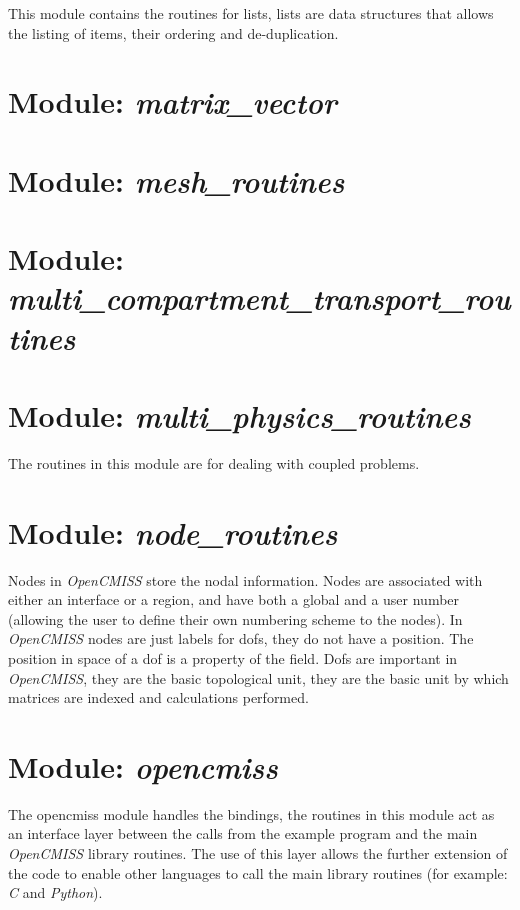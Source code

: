 This module contains the routines for lists, lists are data structures that 
allows the listing of items, their ordering and de-duplication.


\section{Module: \emph{matrix\_vector}}
\label{sec:matrixvector}


\section{Module: \emph{mesh\_routines}}
\label{sec:meshroutines}


\section{Module: \\ \emph{multi\_compartment\_transport\_routines}}
\label{sec:multicompartmenttransportroutines}


\section{Module: \emph{multi\_physics\_routines}}
\label{sec:multiphysicsroutines}

The routines in this module are for dealing with coupled problems.


\section{Module: \emph{node\_routines}}
\label{sec:noderoutines}

Nodes in \emph{OpenCMISS} store the nodal information. Nodes are 
associated with either an interface or a region, and have both a global 
and a user number (allowing the user to define their own numbering scheme 
to the nodes). In \emph{OpenCMISS} nodes are just labels for dofs, they 
do not have a position. The position in space of a dof is a property of 
the field. Dofs are important in \emph{OpenCMISS}, they are the basic topological 
unit, they are the basic unit by which matrices are indexed and 
calculations performed.


\section{Module: \emph{opencmiss}}
\label{sec:opencmiss}

The opencmiss module handles the bindings, the routines in this module act as 
an interface layer between the calls from the example program and the main 
\emph{OpenCMISS} library routines. The use of this layer allows the further 
extension of the code to enable other languages to call the main library 
routines (for example: \emph{C} and \emph{Python}).


